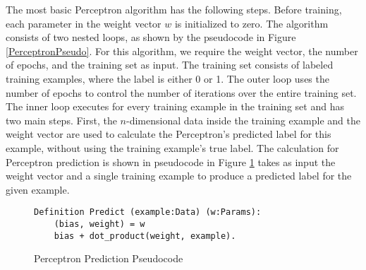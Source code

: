 The most basic Perceptron algorithm has the following steps. Before training, each parameter in the weight vector $w$ is initialized to zero. The algorithm consists of two nested loops, as shown by the pseudocode in Figure \ref{PerceptronPseudo}. For this algorithm, we require the weight vector, the number of epochs, and the training set as input. The training set consists of labeled training examples, where the label is either 0 or 1. The outer loop uses the number of epochs to control the number of iterations over the entire training set. The inner loop executes for every training example in the training set and has two main steps. First, the $n$-dimensional data inside the training example and the weight vector are used to calculate the Perceptron's predicted label for this example, without using the training example's true label. The calculation for Perceptron prediction is shown in pseudocode in Figure \ref{PerceptronPredictPseudo} takes as input the weight vector and a single training example to produce a predicted label for the given example.

\begin{figure}
    \caption{Perceptron Prediction Pseudocode}
    \label{PerceptronPredictPseudo}
    \begin{lstlisting}
Definition Predict (example:Data) (w:Params):
    (bias, weight) = w 
    bias + dot_product(weight, example).
    \end{lstlisting}
\end{figure}

